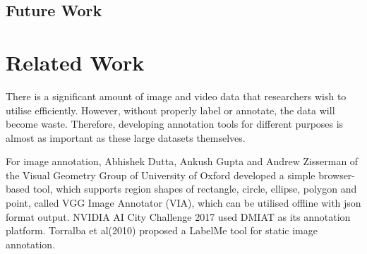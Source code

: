 \documentclass[conference]{IEEEtran}
\def\figref#1{Fig.~\ref{#1}}
\begin{document}
\subsection{Future Work}





	








\section{Related Work}\label{sec.related}

There is a significant amount of image and video data that researchers wish to utilise efficiently. However, without properly label or annotate, the data will become waste. Therefore, developing annotation tools for different purposes is almost as important as these large datasets themselves.

For image annotation, Abhishek Dutta, Ankush Gupta and Andrew Zisserman of the Visual Geometry Group of University of Oxford developed a simple browser-based tool, which supports region shapes of rectangle, circle, ellipse, polygon and point, called VGG Image Annotator (VIA)\cite{abh2017via}, which can be utilised offline with json format output. NVIDIA AI City Challenge 2017 used DMIAT as its annotation platform. Torralba et al(2010)\cite{Russell2008labelme} proposed a LabelMe tool for static image annotation.  
\end{document}
